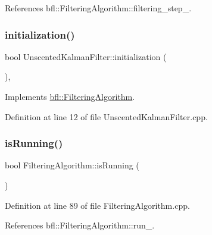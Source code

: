 References bfl\+::\+Filtering\+Algorithm\+::filtering\+\_\+step\+\_\+.

\mbox{\label{classbfl_1_1UnscentedKalmanFilter_ad221e4abd58c2e67e9b44f52a0c9504f}} 
\subsubsection{\texorpdfstring{initialization()}{initialization()}}
{\footnotesize\ttfamily bool Unscented\+Kalman\+Filter\+::initialization (\begin{DoxyParamCaption}{ }\end{DoxyParamCaption})\hspace{0.3cm}{\ttfamily [override]}, {\ttfamily [virtual]}}



Implements \mbox{\hyperlink{classbfl_1_1FilteringAlgorithm_adebe2ec2372f97a2a5baecf8c2c2a9c9}{bfl\+::\+Filtering\+Algorithm}}.



Definition at line 12 of file Unscented\+Kalman\+Filter.\+cpp.

\mbox{\label{classbfl_1_1FilteringAlgorithm_a5cfecab2c778620e2557237472bb1721}} 
\subsubsection{\texorpdfstring{is\+Running()}{isRunning()}}
{\footnotesize\ttfamily bool Filtering\+Algorithm\+::is\+Running (\begin{DoxyParamCaption}{ }\end{DoxyParamCaption})\hspace{0.3cm}{\ttfamily [inherited]}}



Definition at line 89 of file Filtering\+Algorithm.\+cpp.



References bfl\+::\+Filtering\+Algorithm\+::run\+\_\+.

